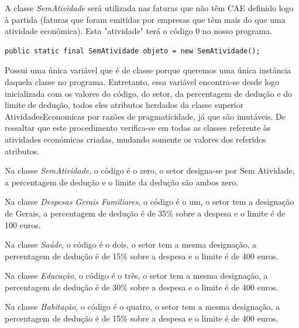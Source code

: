\documentclass[a4paper]{article}
\begin{document}
A classe \emph{SemAtividade} será utilizada nas faturas que não têm
CAE definido logo à partida (faturas que foram emitidas por empresas que têm
mais do que uma atividade económica).
Esta "atividade" terá o \textsf{código} 0 no nosso programa.

\begin{verbatim}
public static final SemAtividade objeto = new SemAtividade();
\end{verbatim}

Possui uma única variável que é de classe porque queremos uma única instância
daquela classe no programa. Entretanto, essa variável encontra-se desde logo
inicializada com os valores do código, do setor, da percentagem de dedução e
do limite de dedução, todos eles atributos herdados da classe superior
AtividadesEconomicas por razões de pragmaticidade, já que são imutáveis.
De ressaltar que este procedimento verifica-se em todas as classes referente
às atividades económicas criadas, mudando somente os valores dos referidos atributos.

\vspace{0.2cm}

Na classe \emph{SemAtividade}, o código é o zero, o setor designa-se por Sem
Atividade, a percentagem de dedução e o limite da dedução são ambos zero.

\vspace{0.2cm}

Na classe \emph{Despesas Gerais Familiares}, o código é o um, o setor tem a
designação de Gerais, a percentagem de dedução é de 35\% sobre a despesa e o
limite é de 100 euros.

\vspace{0.2cm}

Na classe \emph{Saúde}, o código é o dois, o setor tem a mesma
designação, a percentagem de dedução é de 15\% sobre a despesa e o
limite é de 400 euros.

\vspace{0.2cm}

Na classe \emph{Educação}, o código é o três, o setor tem a mesma
designação, a percentagem de dedução é de 30\% sobre a despesa e o
limite é de 400 euros.

\vspace{0.2cm}

Na classe \emph{Habitação}, o código é o quatro, o setor tem a mesma
designação, a percentagem de dedução é de 15\% sobre a despesa e o
limite é de 400 euros.

\vspace{0.2cm}
\end{document}
